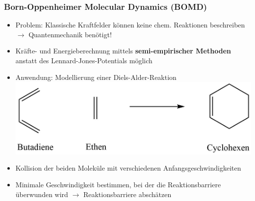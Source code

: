 \begin{frame}
  \frametitle{Born-Oppenheimer Molecular Dynamics (BOMD)}
  \begin{itemize}
    \item Problem: Klassische Kraftfelder können keine chem. Reaktionen beschreiben $\rightarrow$ Quantenmechanik benötigt!
    \item Kräfte- und Energieberechnung mittels \textbf{semi-empirischer Methoden} anstatt des Lennard-Jones-Potentials möglich
    \item Anwendung: Modellierung einer Diels-Alder-Reaktion
    \includegraphics[scale=0.15]{DielsAlder.png}
    \item Kollision der beiden Moleküle mit verschiedenen Anfangsgeschwindigkeiten
    \item Minimale Geschwindigkeit bestimmen, bei der die Reaktionsbarriere überwunden wird $\rightarrow$ Reaktionsbarriere abschätzen
  \end{itemize}
\end{frame}
